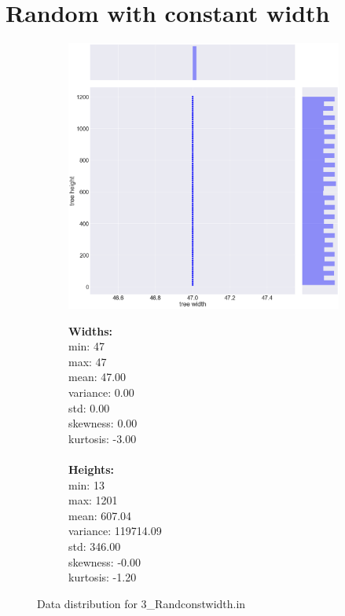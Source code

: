 \section{Random with constant width}
\begin{figure}[H]
\centering
\begin{subfigure}{.8\textwidth}
	\includegraphics[width=.9\textwidth]{img/3_RANDCONSTWIDTH_plot.png}
\end{subfigure}%
\begin{subfigure}{.2\textwidth}
  \centering
  \begin{minipage}{1\textwidth}
\textbf{Widths:}
\\
min: 47
\\
max: 47
\\
mean: 47.00
\\
variance: 0.00
\\
std: 0.00
\\
skewness: 0.00
\\
kurtosis: -3.00
\\\\
\textbf{Heights:}
\\
min: 13
\\
max: 1201
\\
mean: 607.04
\\
variance: 119714.09
\\
std: 346.00
\\
skewness: -0.00
\\
kurtosis: -1.20
  \end{minipage}
\end{subfigure}
\caption{Data distribution for 3\_Randconstwidth.in}
\label{appendix:data:randconstwidth}
\end{figure}
